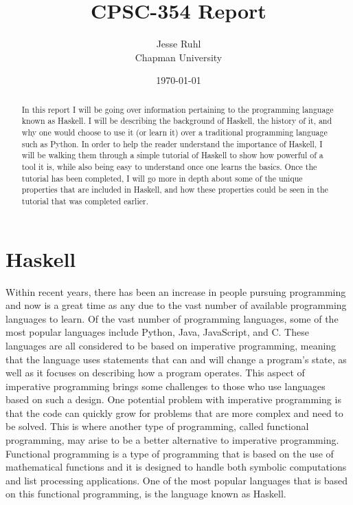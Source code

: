 \documentclass{article}
\title{CPSC-354 Report}
\author{Jesse Ruhl  \\ Chapman University}
\date{\today}
\begin{document}
\maketitle

\begin{abstract}
In this report I will be going over information pertaining to the programming language known as Haskell.
I will be describing the background of Haskell, the history of it, and why one would choose to use it (or learn it) over a traditional programming language such as Python.
In order to help the reader understand the importance of Haskell, I will be walking them through a simple tutorial of Haskell to show how powerful of a tool it is, while also being easy to understand once one learns the basics.
Once the tutorial has been completed, I will go more in depth about some of the unique properties that are included in Haskell, and how these properties could be seen in the tutorial that was completed earlier.
\end{abstract}

\tableofcontents


\section{Haskell}\label{haskell}

\indent Within recent years, there has been an increase in people pursuing programming and now is a great time as any due to the vast number of available programming languages to learn.
Of the vast number of programming languages, some of the most popular languages include Python, Java, JavaScript, and C.
These languages are all considered to be based on imperative programming, meaning that the language uses statements that can and will change a program's state, as well as it focuses on describing how a program operates.
This aspect of imperative programming brings some challenges to those who use languages based on such a design.
One potential problem with imperative programming is that the code can quickly grow for problems that are more complex and need to be solved.
This is where another type of programming, called functional programming, may arise to be a better alternative to imperative programming.
Functional programming is a type of programming that is based on the use of mathematical functions and it is designed to handle both symbolic computations and list processing applications.
One of the most popular languages that is based on this functional programming, is the language known as Haskell.
\end{document}
